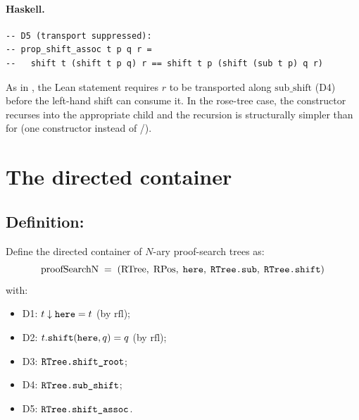\documentclass[11pt,a4paper]{article}
\begin{document}
\paragraph{Haskell.}
\begin{lstlisting}[style=haskell]
-- D5 (transport suppressed):
-- prop_shift_assoc t p q r =
--   shift t (shift t p q) r == shift t p (shift (sub t p) q r)
\end{lstlisting}

\begin{fidelitynote}
As in , the Lean statement requires $r$ to be transported
along $\mathrm{sub\_shift}$ (D4) before the left-hand shift can consume it.
In the rose-tree case, the  constructor recurses into the
appropriate child and the recursion is structurally simpler than for
 (one constructor instead of /).
\end{fidelitynote}


\section{The directed container}

\subsection{Definition: }

\begin{defn}
Define the directed container of $N$-ary proof-search trees as:
\[
  \mathrm{proofSearchN} \;=\; (\mathrm{RTree},\; \mathrm{RPos},\;
  \texttt{here},\; \texttt{RTree.sub},\; \texttt{RTree.shift})
\]
with:
\begin{itemize}
  \item D1: $t \downarrow \texttt{here} = t$ (by $\mathrm{rfl}$);
  \item D2: $t.\texttt{shift}(\texttt{here}, q) = q$ (by $\mathrm{rfl}$);
  \item D3: $\texttt{RTree.shift\_root}$;
  \item D4: $\texttt{RTree.sub\_shift}$;
  \item D5: $\texttt{RTree.shift\_assoc}$.
\end{itemize}
\end{defn}
\end{document}

